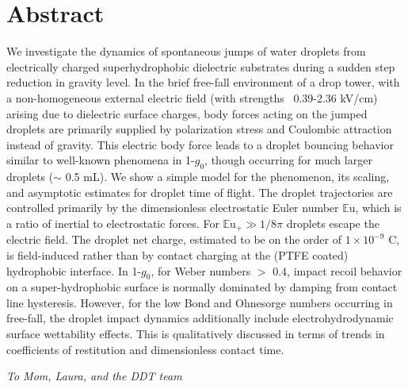 \documentclass[12pt,a4paper,oneside]{book}
\begin{document}
\section*{Abstract}
\noindent
We investigate the dynamics of spontaneous jumps of water droplets from electrically charged superhydrophobic dielectric substrates during a sudden step reduction in gravity level. In the brief free-fall environment of a drop tower, with a non-homogeneous external electric field (with strengths ~0.39-2.36 kV/cm) arising due to dielectric surface charges, body forces acting on the jumped droplets are primarily supplied by polarization stress and Coulombic attraction instead of gravity. This electric body force leads to a droplet bouncing behavior similar to well-known phenomena in 1-$g_0$, though occurring for much larger droplets ($\sim$ 0.5 mL). We show a simple model for the phenomenon, its scaling, and asymptotic estimates for droplet time of flight. The droplet trajectories are controlled primarily by the dimensionless electrostatic Euler number $\mathbb{E}\mbox{u}$, which is a ratio of inertial to electrostatic forces. For ${\mathbb{E}\mbox{u}}_+ \gg 1/8 \pi$ droplets escape the electric field. The droplet net charge, estimated to be on the order of $1 \times 10^{-9}$ C, is field-induced rather than by contact charging at the (PTFE coated) hydrophobic interface. In 1-$g_0$, for Weber numbers $>$ 0.4, impact recoil behavior on a super-hydrophobic surface is normally dominated by damping from contact line hysteresis. However, for the low Bond and Ohnesorge numbers occurring in free-fall, the droplet impact dynamics additionally include electrohydrodynamic surface wettability effects. This is qualitatively discussed in terms of trends in coefficients of restitution and dimensionless contact time.

\clearpage

\vspace*{\fill}

\emph{To Mom, Laura, and the DDT team}\\
\vspace*{\fill}

\clearpage
\end{document}
